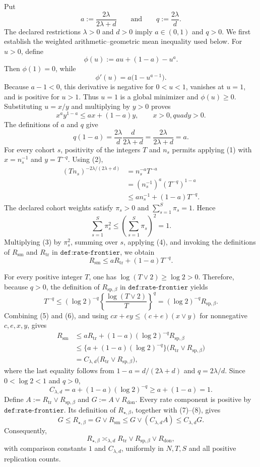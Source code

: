 Put
\[
a:=\frac{2\lambda}{2\lambda+d}
\qquad\text{and}\qquad
q:=\frac{2\lambda}{d}.
\]
The declared restrictions \(\lambda>0\) and \(d>0\) imply \(a\in(0,1)\) and \(q>0\).  We first establish the weighted arithmetic--geometric mean inequality used below.  For \(u>0\), define
\[
\phi(u):=au+(1-a)-u^a.
\]
Then \(\phi(1)=0\), while
\[
\phi'(u)=a\bigl(1-u^{a-1}\bigr).
\]
Because \(a-1<0\), this derivative is negative for \(0<u<1\), vanishes at \(u=1\), and is positive for \(u>1\).  Thus \(u=1\) is a global minimizer and \(\phi(u)\geq0\).  Substituting \(u=x/y\) and multiplying by \(y>0\) proves
\[
x^a y^{1-a}\leq ax+(1-a)y,
\qquad x>0,quad y>0.
\tag{1}
\]
The definitions of \(a\) and \(q\) give
\[
q(1-a)
=\frac{2\lambda}{d}\frac{d}{2\lambda+d}
=\frac{2\lambda}{2\lambda+d}
=a.
\tag{2}
\]
For every cohort \(s\), positivity of the integers \(T\) and \(n_s\) permits applying (1) with \(x=n_s^{-1}\) and \(y=T^{-q}\).  Using (2),
\[
\begin{aligned}
(Tn_s)^{-2\lambda/(2\lambda+d)}
&=n_s^{-a}T^{-a}\\
&=(n_s^{-1})^a(T^{-q})^{1-a}\\
&\leq a n_s^{-1}+(1-a)T^{-q}.
\end{aligned}
\tag{3}
\]
The declared cohort weights satisfy \(\pi_s>0\) and \(\sum_{s=1}^S\pi_s=1\).  Hence
\[
\sum_{s=1}^S\pi_s^2
\leq\left(\sum_{s=1}^S\pi_s\right)^2
=1.
\tag{4}
\]
Multiplying (3) by \(\pi_s^2\), summing over \(s\), applying (4), and invoking the definitions of \(R_{\mathrm{sm}}\) and \(R_{\mathrm{tr}}\) in \(\texttt{def:rate-frontier}\), we obtain
\[
R_{\mathrm{sm}}
\leq aR_{\mathrm{tr}}+(1-a)T^{-q}.
\tag{5}
\]

For every positive integer \(T\), one has \(\log(T\vee2)\geq\log2>0\).  Therefore, because \(q>0\), the definition of \(R_{\mathrm{sp},\beta}\) in \(\texttt{def:rate-frontier}\) yields
\[
T^{-q}
\leq(\log2)^{-q}
\left\{\frac{\log(T\vee2)}{T}\right\}^{q}
=(\log2)^{-q}R_{\mathrm{sp},\beta}.
\tag{6}
\]
Combining (5) and (6), and using \(cx+ey\leq(c+e)(x\vee y)\) for nonnegative \(c,e,x,y\), gives
\[
\begin{aligned}
R_{\mathrm{sm}}
&\leq aR_{\mathrm{tr}}+(1-a)(\log2)^{-q}R_{\mathrm{sp},\beta}\\
&\leq\bigl\{a+(1-a)(\log2)^{-q}\bigr\}
\bigl(R_{\mathrm{tr}}\vee R_{\mathrm{sp},\beta}\bigr)\\
&=C_{\lambda,d}
\bigl(R_{\mathrm{tr}}\vee R_{\mathrm{sp},\beta}\bigr),
\end{aligned}
\tag{7}
\]
where the last equality follows from \(1-a=d/(2\lambda+d)\) and \(q=2\lambda/d\).  Since \(0<\log2<1\) and \(q>0\),
\[
C_{\lambda,d}=a+(1-a)(\log2)^{-q}
\geq a+(1-a)=1.
\tag{8}
\]
Define \(A:=R_{\mathrm{tr}}\vee R_{\mathrm{sp},\beta}\) and \(G:=A\vee R_{\mathrm{don}}\).  Every rate component is positive by \(\texttt{def:rate-frontier}\).  Its definition of \(R_{\star,\beta}\), together with (7)--(8), gives
\[
G
\leq R_{\star,\beta}
=G\vee R_{\mathrm{sm}}
\leq G\vee(C_{\lambda,d}A)
\leq C_{\lambda,d}G.
\tag{9}
\]
Consequently,
\[
R_{\star,\beta}
\asymp_{\lambda,d}
R_{\mathrm{tr}}\vee R_{\mathrm{sp},\beta}\vee R_{\mathrm{don}},
\]
with comparison constants \(1\) and \(C_{\lambda,d}\), uniformly in \(N,T,S\) and all positive replication counts.

